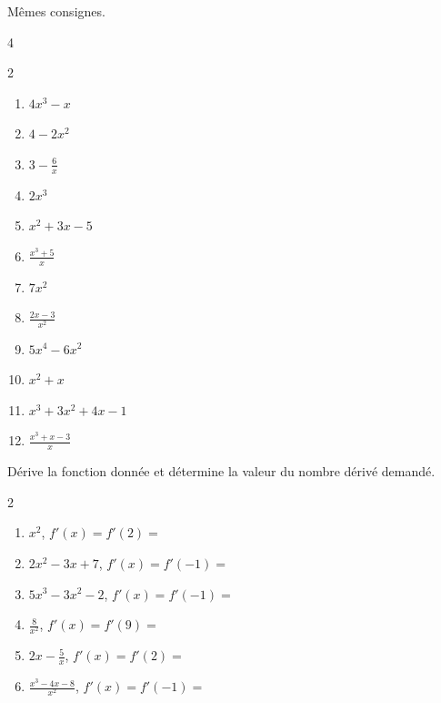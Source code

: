 \documentclass[main.tex]{subfiles}
\begin{document}
\begin{exercise}\label{chapter06:exercice:derivation:operation01}Mêmes consignes.
	\vspace{-1em}
\begin{multicols}{4}
	\begin{spacing}{2} 
	\begin{enumerate}[label={\arabic*)$f(x)=$}, leftmargin=*]
		\item $4x^3-x$ 
		\item $4-2x^2$ 
		\item $3-\frac{6}{x}$ 
		\item $2x^3$ 
		\item $x^2+3x-5$ 
		\item $\frac{x^3+5}{x}$
		\item $7x^2$
		\item $\frac{2x-3}{x^2}$  
		\item $5x^4-6x^2$
		\item $x^2+x$
		\item $x^3+3x^2+4x-1$
		\item $\frac{x^3+x-3}{x}$ 
\end{enumerate} 
\end{spacing}
\end{multicols}  
\end{exercise}
\begin{exercise} Dérive la fonction donnée et détermine la valeur du nombre dérivé demandé.
		\begin{spacing}{2} 
		\begin{enumerate}[label={\arabic*)$f(x)=$}, leftmargin=*]
			\item $x^2$, $f'(x)=$\dotfill $f'(2)=$\dotfill 
			\item $2x^2-3x+7$, $f'(x)=$\dotfill $f'(-1)=$\dotfill 
			\item $5x^3-3x^2-2$, $f'(x)=$\dotfill $f'(-1)=$\dotfill 
			\item $\frac{8}{x^2}$, $f'(x)=$\dotfill $f'(9)=$\dotfill 
			\item $2x-\frac{5}{x}$, $f'(x)=$\dotfill $f'(2)=$\dotfill
			\item $\frac{x^3-4x-8}{x^2}$, $f'(x)=$\dotfill $f'(-1)=$\dotfill  
		\end{enumerate} 
	\end{spacing}
\end{exercise}\vspace{-1em}
\end{document}
